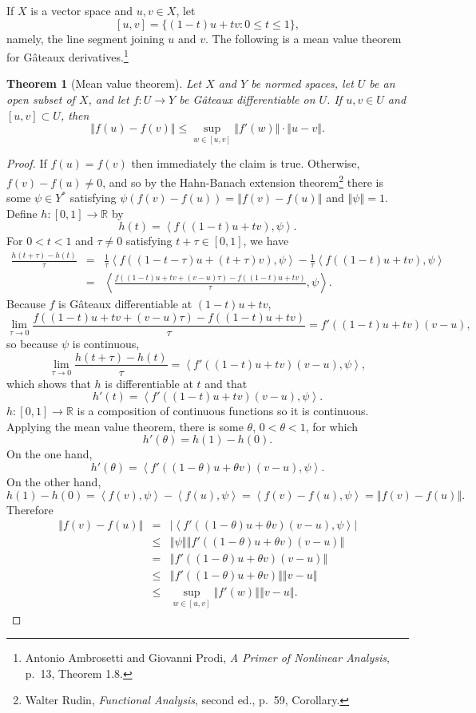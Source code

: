 \documentclass{article}
\newcommand{\inner}[2]{\left\langle #1, #2 \right\rangle}
\newcommand{\norm}[1]{\left\Vert #1 \right\Vert}
\newtheorem{theorem}{Theorem}
\theoremstyle{definition}
\begin{document}
If $X$ is a vector space and $u,v \in X$, let
\[
[u,v] = \{(1-t)u+tv: 0 \leq t \leq 1\},
\]
namely, the line segment joining $u$ and $v$. 
The following is a mean value theorem for G\^ateaux derivatives.\footnote{Antonio Ambrosetti and
Giovanni Prodi, {\em A Primer of Nonlinear Analysis}, p.~13, Theorem 1.8.}

\begin{theorem}[Mean value theorem]
Let $X$ and $Y$  be  normed spaces, let $U$ be an open subset of $X$, and let $f:U \to Y$ be G\^ateaux differentiable on
$U$. If $u,v \in U$ and $[u,v] \subset U$, then
\[
\norm{f(u)-f(v)} \leq \sup_{w \in [u,v]} \norm{f'(w)} \cdot \norm{u-v}.
\]
\label{MVT}
\end{theorem}
\begin{proof}
If $f(u)=f(v)$ then immediately the claim is true. Otherwise, $f(v)-f(u) \neq 0$, and so by the Hahn-Banach extension theorem\footnote{Walter
Rudin, {\em Functional Analysis}, second ed., p.~59, Corollary.} there
is some $\psi \in Y^*$ satisfying $\psi(f(v)-f(u)) = \norm{f(v)-f(u)}$ and $\norm{\psi}=1$. 
Define $h:[0,1] \to \mathbb{R}$ by
\[
h(t)=\inner{f((1-t)u+tv)}{\psi}.
\]
For $0<t<1$ and $\tau \neq 0$ satisfying $t+\tau \in [0,1]$, we have
\begin{eqnarray*}
\frac{h(t+\tau)-h(t)}{\tau}&=&\frac{1}{\tau}\inner{f((1-t-\tau)u+(t+\tau)v)}{\psi}-\frac{1}{\tau}\inner{f((1-t)u+tv)}{\psi}\\
&=&\inner{\frac{f((1-t)u+tv+(v-u)\tau)-f((1-t)u+tv)}{\tau}}{\psi}.
\end{eqnarray*}
Because $f$ is G\^ateaux differentiable at $(1-t)u+tv$, 
\[
\lim_{\tau \to 0} \frac{f((1-t)u+tv+(v-u)\tau)-f((1-t)u+tv)}{\tau} = f'((1-t)u+tv)(v-u),
\]
so because $\psi$ is continuous,
\[
\lim_{\tau \to 0} \frac{h(t+\tau)-h(t)}{\tau} = \inner{f'((1-t)u+tv)(v-u)}{\psi},
\]
which shows that $h$ is differentiable at $t$ and that
\[
h'(t)=\inner{f'((1-t)u+tv)(v-u)}{\psi}.
\]
$h:[0,1] \to \mathbb{R}$ is a composition of continuous functions so it is continuous. Applying the mean value theorem, there is some
$\theta$, $0<\theta<1$, for which
\[
h'(\theta)=h(1)-h(0).
\]
On the one hand,
\[
h'(\theta)=\inner{f'((1-\theta)u+\theta v)(v-u)}{\psi}.
\]
On the other hand,
\[
h(1)-h(0)=\inner{f(v)}{\psi}-\inner{f(u)}{\psi}=\inner{f(v)-f(u)}{\psi}=\norm{f(v)-f(u)}.
\]
Therefore
\begin{eqnarray*}
\norm{f(v)-f(u)} &=& |\inner{f'((1-\theta)u+\theta v)(v-u)}{\psi}|\\
&\leq& \norm{\psi} \norm{f'((1-\theta)u+\theta v)(v-u)}\\
&=&\norm{f'((1-\theta)u+\theta v)(v-u)}\\
&\leq&\norm{f'((1-\theta)u+\theta v)}\norm{v-u}\\
&\leq&\sup_{w \in [u,v]} \norm{f'(w)} \norm{v-u}.
\end{eqnarray*}
\end{proof}
\end{document}
